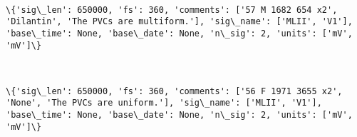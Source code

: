 \documentclass[11pt]{article}
\begin{document}
    \begin{center}
    \end{center}
    { \hspace*{\fill} \\}
    
    \begin{Verbatim}[commandchars=\\\{\}]
\{'sig\_len': 650000, 'fs': 360, 'comments': ['57 M 1682 654 x2', 'Dilantin', 'The PVCs are multiform.'], 'sig\_name': ['MLII', 'V1'], 'base\_time': None, 'base\_date': None, 'n\_sig': 2, 'units': ['mV', 'mV']\}

    \end{Verbatim}

    \begin{center}
    \end{center}
    { \hspace*{\fill} \\}
    
    \begin{Verbatim}[commandchars=\\\{\}]
\{'sig\_len': 650000, 'fs': 360, 'comments': ['56 F 1971 3655 x2', 'None', 'The PVCs are uniform.'], 'sig\_name': ['MLII', 'V1'], 'base\_time': None, 'base\_date': None, 'n\_sig': 2, 'units': ['mV', 'mV']\}

    \end{Verbatim}


    
    
    
    
\end{document}
